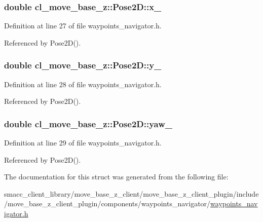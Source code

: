 \subsubsection[{\texorpdfstring{x\+\_\+}{x_}}]{\setlength{\rightskip}{0pt plus 5cm}double cl\+\_\+move\+\_\+base\+\_\+z\+::\+Pose2\+D\+::x\+\_\+}\hypertarget{structcl__move__base__z_1_1Pose2D_a5cf116d8264305c3cf062e573f218854}{}\label{structcl__move__base__z_1_1Pose2D_a5cf116d8264305c3cf062e573f218854}


Definition at line 27 of file waypoints\+\_\+navigator.\+h.



Referenced by Pose2\+D().

\subsubsection[{\texorpdfstring{y\+\_\+}{y_}}]{\setlength{\rightskip}{0pt plus 5cm}double cl\+\_\+move\+\_\+base\+\_\+z\+::\+Pose2\+D\+::y\+\_\+}\hypertarget{structcl__move__base__z_1_1Pose2D_a745b752ce659fca634aaa386230bb931}{}\label{structcl__move__base__z_1_1Pose2D_a745b752ce659fca634aaa386230bb931}


Definition at line 28 of file waypoints\+\_\+navigator.\+h.



Referenced by Pose2\+D().

\subsubsection[{\texorpdfstring{yaw\+\_\+}{yaw_}}]{\setlength{\rightskip}{0pt plus 5cm}double cl\+\_\+move\+\_\+base\+\_\+z\+::\+Pose2\+D\+::yaw\+\_\+}\hypertarget{structcl__move__base__z_1_1Pose2D_aed88c69c4fb64fdca72534843de5350e}{}\label{structcl__move__base__z_1_1Pose2D_aed88c69c4fb64fdca72534843de5350e}


Definition at line 29 of file waypoints\+\_\+navigator.\+h.



Referenced by Pose2\+D().



The documentation for this struct was generated from the following file\+:\begin{DoxyCompactItemize}
\item 
smacc\+\_\+client\+\_\+library/move\+\_\+base\+\_\+z\+\_\+client/move\+\_\+base\+\_\+z\+\_\+client\+\_\+plugin/include/move\+\_\+base\+\_\+z\+\_\+client\+\_\+plugin/components/waypoints\+\_\+navigator/\hyperlink{waypoints__navigator_8h}{waypoints\+\_\+navigator.\+h}\end{DoxyCompactItemize}
